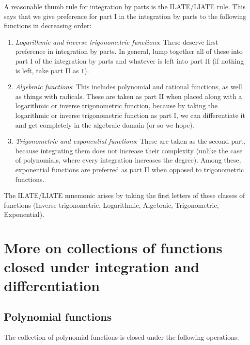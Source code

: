 \documentclass{amsart}
\begin{document}
A reasonable thumb rule for integration by parts is the ILATE/LIATE
rule. This says that we give preference for part I in the integration
by parts to the following functions in decreasing order:

\begin{enumerate}
\item {\em Logarithmic and inverse trigonometric functions}: These
  deserve first preference in integration by parts. In general, lump
  together all of these into part I of the integration by parts and
  whatever is left into part II (if nothing is left, take part II as
  $1$).
\item {\em Algebraic functions}: This includes polynomial and rational
  functions, as well as things with radicals. These are taken as part
  II when placed along with a logarithmic or inverse trigonometric
  function, because by taking the logarithmic or inverse trigonometric
  function as part I, we can differentiate it and get completely in
  the algebraic domain (or so we hope).
\item {\em Trigonometric and exponential functions}: These are taken
  as the second part, because integrating them does not increase their
  complexity (unlike the case of polynomials, where every integration
  increases the degree). Among these, exponential functions are
  preferred as part II when opposed to trigonometric functions.
\end{enumerate}

The ILATE/LIATE mnemonic arises by taking the first letters of these
classes of functions (Inverse trigonometric, Logarithmic, Algebraic,
Trigonometric, Exponential).

\section{More on collections of functions closed under integration and differentiation}

\subsection{Polynomial functions}

The collection of polynomial functions is closed under the following
operations:
\end{document}
